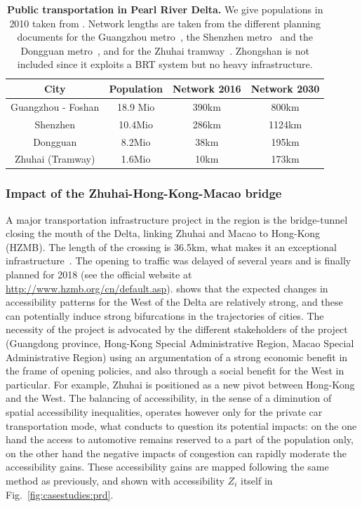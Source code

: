 \begin{table}
\caption{\textbf{Public transportation in Pearl River Delta.} We give populations in 2010 taken from \cite{yearbook2013guangdong}. Network lengths are taken from the different planning documents for the Guangzhou metro~\cite{guangzhou2016metro}, the Shenzhen metro~\cite{shenzhen2016plan} and the Dongguan metro~\cite{dongguan2017ditie}, and for the Zhuhai tramway~\cite{zhuhai2016tram}. Zhongshan is not included since it exploits a BRT system but no heavy infrastructure.\label{tab:casestudies:stats}}
\begin{center}
\begin{tabular}{|c|c|c|c|}\hline
City & Population & Network 2016 & Network 2030 \\\hline
	Guangzhou - Foshan & 18.9 Mio & 390km & 800km \\\hline
	Shenzhen & 10.4Mio & 286km & 1124km \\\hline
	Dongguan & 8.2Mio & 38km & 195km \\\hline
	Zhuhai (Tramway) & 1.6Mio & 10km & 173km \\\hline
\end{tabular}
\end{center}	
\end{table}

\subsubsection{Impact of the Zhuhai-Hong-Kong-Macao bridge}

A major transportation infrastructure project in the region is the bridge-tunnel closing the mouth of the Delta, linking Zhuhai and Macao to Hong-Kong (HZMB). The length of the crossing is 36.5km, what makes it an exceptional infrastructure~\citep{hussain2011hong}. The opening to traffic was delayed of several years and is finally planned for 2018 (see the official website at \url{http://www.hzmb.org/cn/default.asp}). \cite{zhou2016medium} shows that the expected changes in accessibility patterns for the West of the Delta are relatively strong, and these can potentially induce strong bifurcations in the trajectories of cities. The necessity of the project is advocated by the different stakeholders of the project (Guangdong province, Hong-Kong Special Administrative Region, Macao Special Administrative Region) using an argumentation of a strong economic benefit in the frame of opening policies, and also through a social benefit for the West in particular. For example, Zhuhai is positioned as a new pivot between Hong-Kong and the West. The balancing of accessibility, in the sense of a diminution of spatial accessibility inequalities, operates however only for the private car transportation mode, what conducts to question its potential impacts: on the one hand the access to automotive remains reserved to a part of the population only, on the other hand the negative impacts of congestion can rapidly moderate the accessibility gains. These accessibility gains are mapped following the same method as previously, and shown with accessibility $Z_i$ itself in Fig.~\ref{fig:casestudies:prd}.


